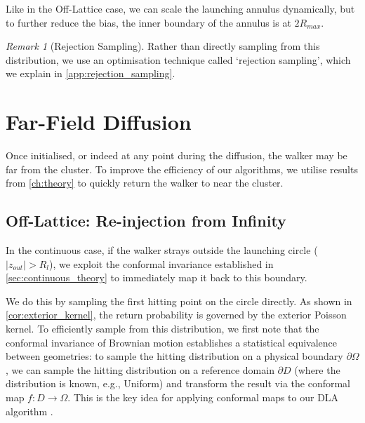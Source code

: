 \documentclass[12pt, a4paper, oneside]{report}
\theoremstyle{remark}
\newtheorem{remark}[theorem]{Remark}
\begin{document}
Like in the Off-Lattice case, we can scale the launching annulus dynamically, but to further reduce the bias, the inner boundary of the annulus is at $2R_{max}$.
\begin{remark}[Rejection Sampling]
Rather than directly sampling from this distribution, we use an optimisation technique called `rejection sampling', which we explain in \cref{app:rejection_sampling}.
\end{remark}


\section{Far-Field Diffusion}
\label{sec:far_field}
Once initialised, or indeed at any point during the diffusion, the walker may be far from the cluster. To improve the efficiency of our algorithms, we utilise results from \cref{ch:theory} to quickly return the walker to near the cluster.

\subsection{Off-Lattice: Re-injection from Infinity}
In the continuous case, if the walker strays outside the launching circle ($|z_{out}| > R_l$), we exploit the conformal invariance established in \cref{sec:continuous_theory} to immediately map it back to this boundary.

We do this by sampling the first hitting point on the circle directly. As shown in \cref{cor:exterior_kernel}, the return probability is governed by the exterior Poisson kernel.
To efficiently sample from this distribution, we first note that the conformal invariance of Brownian motion establishes a statistical equivalence between geometries: to sample the hitting distribution on a physical boundary $\partial \Omega$, we can sample the hitting distribution on a reference domain $\partial D$ (where the distribution is known, e.g., Uniform) and transform the result via the conformal map $f: D \to \Omega$. This is the key idea for applying conformal maps to our DLA algorithm \cite{Bell2019}. 
\end{document}
